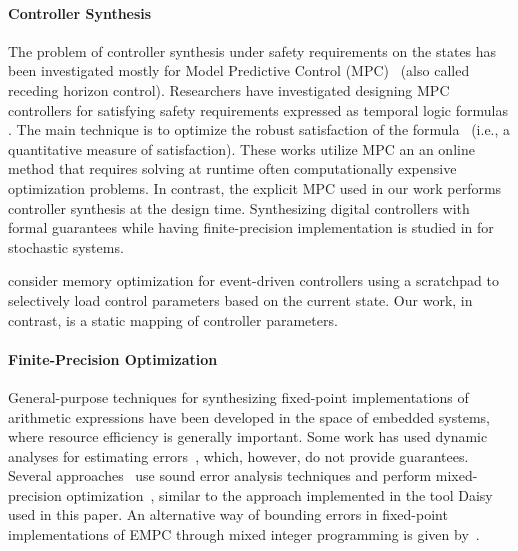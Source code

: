 \paragraph{Controller Synthesis}
The problem of controller synthesis under safety requirements on the states has
been investigated mostly for Model Predictive Control (MPC)~\cite{camacho2013model} (also called receding horizon control).
Researchers have investigated designing MPC controllers for satisfying safety requirements expressed as temporal logic formulas 
\cite{FMPS18,KaramanSF08,raman2014model,WongpiromsarnTM12,pant2017smooth,kim2017dynamic}.
The main technique is to optimize the robust satisfaction of 
the formula~\cite{donze2010robust} (i.e., a quantitative measure of satisfaction).
These works utilize MPC an an online method that requires solving at runtime often computationally 
expensive optimization problems. In contrast, the explicit MPC used in our work performs controller synthesis at the design time.
Synthesizing digital controllers with formal guarantees while having finite-precision implementation is studied in \cite{SSPBLSZ19} for stochastic systems.

\citet{SahaM12} consider memory optimization for event-driven controllers
using a scratchpad to selectively load control parameters based on the current state.
Our work, in contrast, is a static mapping of controller parameters.


\paragraph{Finite-Precision Optimization}
General-purpose techniques for synthesizing fixed-point implementations of 
arithmetic expressions have been developed in the space of embedded systems,
where resource efficiency is generally important.
Some work has used dynamic analyses for estimating
errors~\cite{Gaffar2004,Mallik2007}, which, however, do not provide guarantees.
Several approaches~\cite{Lee2006,Osborne2007,Kinsman2009,Pang2011} use sound
error analysis techniques and perform mixed-precision optimization~\cite{Lee2006,Pang2011},
similar to the approach implemented in the tool Daisy used in this paper.
An alternative way of bounding errors in fixed-point implementations of EMPC 
through mixed integer programming is given by~\citet{imperialrmpc}. 

